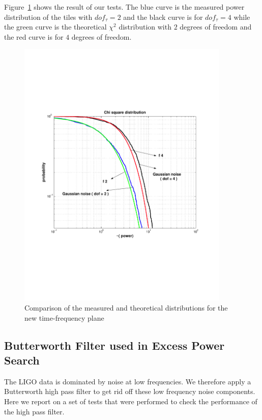 Figure~\ref{fig:compchisquarenew} shows the result of our tests. 
The blue curve is the measured power distribution of the tiles with $dof_{\tau} = 2$ 
and the black curve is for $dof_{\tau} = 4$ while the green 
curve is the theoretical $\chi^2$ distribution with $2$ degrees of freedom
and the red curve is for $4$ degrees of freedom.  
\begin{figure}[h]
\begin{center}
\includegraphics[width=0.9\textwidth]{figures/compchisquarenew2_4}
\caption{Comparison of the measured and theoretical distributions for the
  new time-frequency plane}
\label{fig:compchisquarenew}
\end{center}
\end{figure}     


\clearpage

\subsection{Butterworth Filter used in Excess Power Search}
\label{section:Butterworth}

The LIGO data is dominated by noise at low frequencies. We 
therefore apply a Butterworth high pass filter to get rid off these 
low frequency noise components. Here we report on a set of tests 
that were performed to check the performance of the high pass filter.

